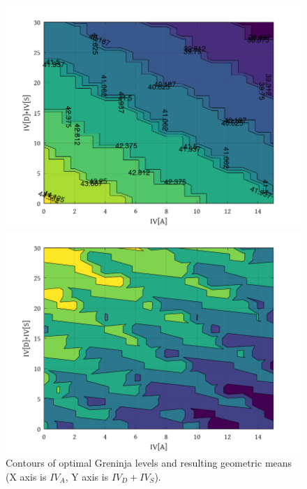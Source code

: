 \begin{figure}
\begin{minipage}{0.5\textwidth}\begin{center}
\includegraphics[width=\textwidth,keepaspectratio]{octave/greninjalevels.png}
\end{center}\end{minipage}%
\begin{minipage}{0.5\textwidth}\begin{center}
\includegraphics[width=\textwidth,keepaspectratio]{octave/greninjagmeans.png}
\end{center}\end{minipage}%
\caption[Contours of optimal Greninja levels]{Contours of optimal Greninja levels and resulting geometric means
  (X axis is $IV_A$, Y axis is $IV_D + IV_S$).\label{fig:contours}}
\end{figure}
